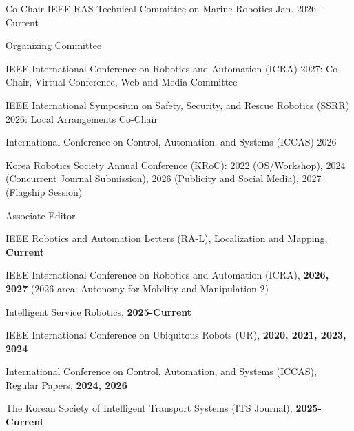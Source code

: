 
\begin{cventries}

  \cventry
    {Co-Chair} %
    {IEEE RAS Technical Committee on Marine Robotics} %
    {} %
    {Jan. 2026 - Current} %
    {}

    \vspace{3mm}

  \cventry
    {} %
    {Organizing Committee} %
    {} %
    {} %
    {
      \begin{cvitems} %
        \item {IEEE International Conference on Robotics and Automation (ICRA) 2027: Co-Chair, Virtual Conference, Web and Media Committee}
        \item {IEEE International Symposium on Safety, Security, and Rescue Robotics (SSRR) 2026: Local Arrangements Co-Chair}
        \item {International Conference on Control, Automation, and Systems (ICCAS) 2026 } 
        \item {Korea Robotics Society Annual Conference (KRoC): 2022 (OS/Workshop), 2024 (Concurrent Journal Submission), 2026 (Publicity and Social Media), 2027 (Flagship Session)}
      \end{cvitems}
   }

    \vspace{3mm}

  \cventry
    {} %
    {Associate Editor} %
    {} %
    {} %
    {
      \begin{cvitems} %
        \item {IEEE Robotics and Automation Letters (RA-L), Localization and Mapping, \textbf{Current}}
        \item {IEEE International Conference on Robotics and Automation (ICRA), \textbf{2026, 2027} (2026 area: Autonomy for Mobility and Manipulation 2)}
        \item {Intelligent Service Robotics, \textbf{2025-Current}}
        \item {IEEE International Conference on Ubiquitous Robots (UR), \textbf{2020, 2021, 2023, 2024}}
        \item {International Conference on Control, Automation, and Systems (ICCAS), Regular Papers, \textbf{2024, 2026}}
        \item {The Korean Society of Intelligent Transport Systems (ITS Journal),  \textbf{2025-Current}}
      \end{cvitems}
    }


\end{cventries}
